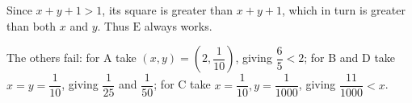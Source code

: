 Since $x+y+1>1$, its square is greater than $x+y+1$, which in turn is greater than both $x$ and $y$. Thus $\boxed{\text{E}}$ always works.

The others fail: for A take $(x,y)=\left(2,\dfrac{1}{10}\right)$, giving $\dfrac{6}{5}<2$; for B and D take $x=y=\dfrac{1}{10}$, giving $\dfrac{1}{25}$ and $\dfrac{1}{50}$; for C take $x=\dfrac{1}{10},y=\dfrac{1}{1000}$, giving $\dfrac{11}{1000}<x$.
